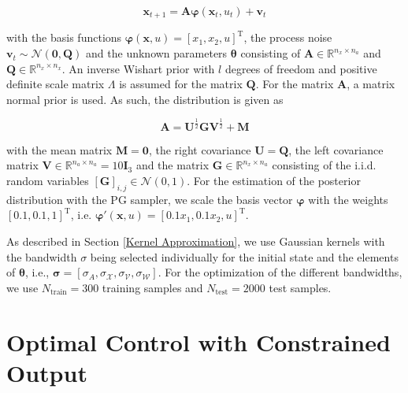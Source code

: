 \begin{equation} \label{State transition}
\boldsymbol{x}_{t+1} = \boldsymbol{A} \boldsymbol{\varphi}(\boldsymbol{x}_t, u_t) + \boldsymbol{v}_{t}
\end{equation}

with the basis functions $\boldsymbol{\varphi} (\boldsymbol{x}, u) = \left[ x_1,  x_2,  u \right]^\text{T}$, the process noise $\boldsymbol{v}_{t} \sim \mathcal{N} (\boldsymbol{0}, \boldsymbol{Q})$ and the unknown parameters $\boldsymbol{\theta}$ consisting of $\boldsymbol{A}  \in \mathbb{R}^{n_x \times n_a}$ and $\boldsymbol{Q} \in \mathbb{R}^{n_x \times n_x}$. An inverse Wishart prior with $l$ degrees of freedom and positive definite scale matrix $\Lambda$ is assumed for the matrix $\boldsymbol{Q}$. For the matrix $\boldsymbol{A}$, a matrix normal prior is used. As such, the distribution is given as

\begin{equation}
\boldsymbol{A} = \boldsymbol{U}^{\frac{1}{2}}\boldsymbol{G} \boldsymbol{V}^{\frac{1}{2}} + \boldsymbol{M}
\end{equation}

with the mean matrix $\boldsymbol{M} = \boldsymbol{0}$, the right covariance $\boldsymbol{U} = \boldsymbol{Q}$, the left covariance matrix $\boldsymbol{V} \in \mathbb{R}^{n_a \times n_a} = 10 \boldsymbol{I}_3$ and the matrix $\boldsymbol{G} \in \mathbb{R}^{n_x \times n_a}$ consisting of the i.i.d. random variables $[\boldsymbol{G}]_{i,j} \in \mathcal{N}(0,1)$. For the estimation of the posterior distribution with the PG sampler, we scale the basis vector $\boldsymbol{\varphi}$ with the weights $\left[ 0.1,  0.1,  1 \right]^\text{T}$, i.e. $\boldsymbol{\varphi}' (\boldsymbol{x}, u)  =  \left[0.1 x_1,  0.1 x_2,  u \right]^\text{T}$.

As described in Section \ref{Kernel Approximation}, we use Gaussian kernels with the bandwidth $\sigma$ being selected individually for the initial state and the elements of $\boldsymbol{\theta}$, i.e., $\boldsymbol{\sigma} = [\sigma_A, \sigma_\mathcal{X}, \sigma_\mathcal{V}, \sigma_\mathcal{W}]$. For the optimization of the different bandwidths, we use $N_\text{train} = 300$ training samples and $N_\text{test} = 2000$ test samples.

\section{Optimal Control with Constrained Output} \label{optimal control}

